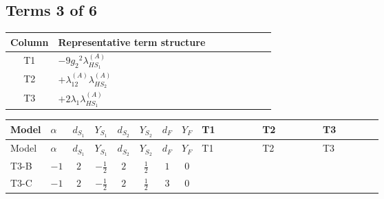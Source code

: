 \documentclass[8pt]{article}
\begin{document}
\begin{landscape}
\subsection*{Terms 3 of 6}
\begin{center}
\begin{tabular}{@{}c >{\raggedright\arraybackslash}p{0.82\linewidth}@{}}
\toprule
Column & Representative term structure \\
\midrule
T1 & \(\displaystyle -9 {g_2}^2 {\lambda_{HS_1}^{(A)}}\) \\
\midrule
T2 & \(\displaystyle +{\lambda_{12}^{(A)}} {\lambda_{HS_2}^{(A)}}\) \\
\midrule
T3 & \(\displaystyle +2 {\lambda_1} {\lambda_{HS_1}^{(A)}}\) \\
\midrule
\bottomrule
\end{tabular}
\end{center}
\smallskip
\tiny
\begin{longtable}{@{}llcccccc >{\raggedright\arraybackslash}p{0.21\linewidth} >{\raggedright\arraybackslash}p{0.21\linewidth} >{\raggedright\arraybackslash}p{0.21\linewidth}@{}}
\toprule
Model & $\alpha$ & $d_{S_1}$ & $Y_{S_1}$ & $d_{S_2}$ & $Y_{S_2}$ & $d_F$ & $Y_F$ & T1 & T2 & T3 \\
\midrule
\endfirsthead
\toprule
Model & $\alpha$ & $d_{S_1}$ & $Y_{S_1}$ & $d_{S_2}$ & $Y_{S_2}$ & $d_F$ & $Y_F$ & T1 & T2 & T3 \\
\midrule
\endhead
T3-B & $-1$ & $2$ & $-\frac{1}{2}$ & $2$ & $\frac{1}{2}$ & $1$ & $0$ & \scriptsize\adjustbox{max width=\linewidth}{$\begin{gathered} -9 {g_2}^2 {\lambda_{HS_1}^{(A)}}\end{gathered}$} & \scriptsize\adjustbox{max width=\linewidth}{$\begin{gathered} +{\lambda_{12}^{(A)}} {\lambda_{HS_2}^{(A)}}\end{gathered}$} & \scriptsize\adjustbox{max width=\linewidth}{$\begin{gathered} +2 {\lambda_1} {\lambda_{HS_1}^{(A)}}\end{gathered}$} \\
\midrule
T3-C & $-1$ & $2$ & $-\frac{1}{2}$ & $2$ & $\frac{1}{2}$ & $3$ & $0$ & \scriptsize\adjustbox{max width=\linewidth}{$\begin{gathered} -9 {g_2}^2 {\lambda_{HS_1}^{(A)}}\end{gathered}$} & \scriptsize\adjustbox{max width=\linewidth}{$\begin{gathered} +{\lambda_{12}^{(A)}} {\lambda_{HS_2}^{(A)}}\end{gathered}$} & \scriptsize\adjustbox{max width=\linewidth}{$\begin{gathered} +2 {\lambda_1} {\lambda_{HS_1}^{(A)}}\end{gathered}$} \\

\end{longtable}
\end{landscape}
\end{document}
